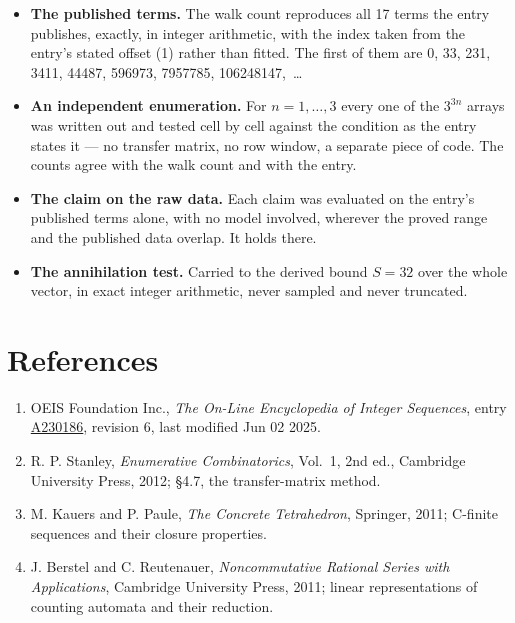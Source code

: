 \documentclass[11pt]{article}
\theoremstyle{definition}
\begin{document}
\begin{itemize}

\item {\bfseries The published terms.} The walk count reproduces all 17 terms the entry publishes, exactly, in integer arithmetic, with the index taken from the entry's stated offset (1) rather than fitted. The first of them are 0, 33, 231, 3411, 44487, 596973, 7957785, 106248147,~\dots

\item {\bfseries An independent enumeration.} For $n = 1,\dots,3$ every one of the $3^{3n}$ arrays was written out and tested cell by cell against the condition as the entry states it --- no transfer matrix, no row window, a separate piece of code. The counts agree with the walk count and with the entry.

\item {\bfseries The claim on the raw data.} Each claim was evaluated on the entry's published terms alone, with no model involved, wherever the proved range and the published data overlap. It holds there.

\item {\bfseries The annihilation test.} Carried to the derived bound $S = 32$ over the whole vector, in exact integer arithmetic, never sampled and never truncated.

\end{itemize}

\section{References}

\begin{enumerate}

\item OEIS Foundation Inc., \emph{The On-Line Encyclopedia of Integer Sequences}, entry \href{https://oeis.org/A230186}{A230186}, revision 6, last modified Jun 02 2025.

\item R. P. Stanley, \emph{Enumerative Combinatorics}, Vol.~1, 2nd ed., Cambridge University Press, 2012; \S4.7, the transfer-matrix method.

\item M. Kauers and P. Paule, \emph{The Concrete Tetrahedron}, Springer, 2011; C-finite sequences and their closure properties.

\item J. Berstel and C. Reutenauer, \emph{Noncommutative Rational Series with Applications}, Cambridge University Press, 2011; linear representations of counting automata and their reduction.

\end{enumerate}
\end{document}
